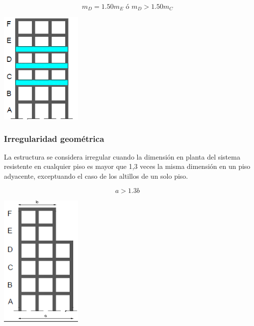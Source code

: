 \documentclass{report}
\begin{document}
\begin{center}
    \begin{minipage}{0.4\textwidth}
        \centering
        $$m_D = 1.50m_E \text{ \'o } m _D > 1.50 m_C$$
    \end{minipage}%
    \begin{minipage}{0.4\textwidth}
        \centering
        \includegraphics[width=0.3\textwidth]{imagenes/distribucion_de_masa.png}
    \end{minipage}
\end{center}
    
\subsubsection{Irregularidad geom\'etrica }
La estructura se considera irregular cuando la dimensi\'on en planta del sistema resistente en cualquier piso 
es mayor que 1,3 veces la misma dimensi\'on en un piso adyacente, exceptuando el caso de los altillos de un solo piso.

\begin{center}
    \begin{minipage}{0.4\textwidth}
        \centering
        $$a > 1.3b$$
    \end{minipage}
    \begin{minipage}{0.4\textwidth}
        \centering
        \includegraphics[width=0.3\textwidth]{imagenes/irregularidad_geometrica.png}
    \end{minipage}
\end{center}
\end{document}

